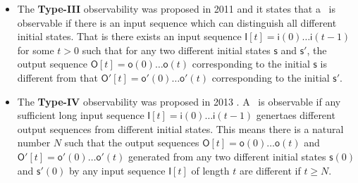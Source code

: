 \begin{itemize}
\item The  {\bf Type-III} observability was proposed in 2011 \cite{Cheng2011Identification} and it states that a \BCN\  is observable if there is an input sequence which can distinguish all different initial states. That is there exists an input sequence  $\mathsf{I}[t]=\mathsf{i}(0)\ldots\mathsf{i}(t-1)$ for some $t>0$ such that for any two different initial states $\mathsf{s}$ and $\mathsf{s}'$, the output sequence $\mathsf{O}[t]=\mathsf{o}(0)\ldots\mathsf{o}(t)$  corresponding to the initial  $\mathsf{s}$  is different from that  $\mathsf{O}'[t]=\mathsf{o}'(0)\ldots\mathsf{o}'(t)$ corresponding to the initial $\mathsf{s}'$.


	
\item The  {\bf Type-IV}  observability was  proposed in 2013 \cite{Fornasini2013Observability}. A  \BCN\ is observable if any sufficient long input sequence  $\mathsf{I}[t]=\mathsf{i}(0)\ldots\mathsf{i}(t-1)$  genertaes different output sequences  from different initial states. This means there is a  natural number $N$ such that  the output sequences $\mathsf{O}[t]=\mathsf{o}(0) \ldots\mathsf{o}(t)$ and  $\mathsf{O}'[t]=\mathsf{o}'(0)\ldots\mathsf{o}'(t)$  generated from any two different initial states $\mathsf{s}(0)$ and $\mathsf{s}'(0)$ by any input sequence $\mathsf{I}[t]$  of length $t$ are different if $t\geq N$.


\end{itemize}

